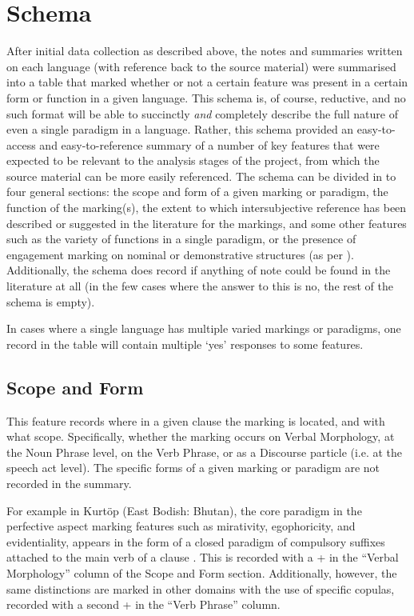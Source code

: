 \section{Schema}\label{s:Methods:Schema}
After initial data collection as described above, the notes and summaries written on each language (with reference back to the source material) were summarised into a table that marked whether or not a certain feature was present in a certain form or function in a given language. This schema is, of course, reductive, and no such format will be able to succinctly \textit{and} completely describe the full nature of even a single paradigm in a language. Rather, this schema provided an easy-to-access and easy-to-reference summary of a number of key features that were expected to be relevant to the analysis stages of the project, from which the source material can be more easily referenced. The schema can be divided in to four general sections: the scope and form of a given marking or paradigm, the function of the marking(s), the extent to which intersubjective reference has been described or suggested in the literature for the markings, and some other features such as the variety of functions in a single paradigm, or the presence of engagement marking on nominal or demonstrative structures (as per ). Additionally, the schema does record if anything of note could be found in the literature at all (in the few cases where the answer to this is no, the rest of the schema is empty).

In cases where a single language has multiple varied markings or paradigms, one record in the table will contain multiple `yes' responses to some features.

\subsection{Scope and Form}
This feature records where in a given clause the marking is located, and with what scope. Specifically, whether the marking occurs on Verbal Morphology, at the Noun Phrase level, on the Verb Phrase, or as a Discourse particle (i.e. at the speech act level). The specific forms of a given marking or paradigm are not recorded in the summary.

For example in Kurtöp (East Bodish: Bhutan), the core paradigm in the perfective aspect marking features such as mirativity, egophoricity, and evidentiality, appears in the form of a closed paradigm of compulsory suffixes attached to the main verb of a clause \cite{Hyslop2018}. This is recorded with a + in the ``Verbal Morphology'' column of the Scope and Form section. Additionally, however, the same distinctions are marked in other domains with the use of specific copulas, recorded with a second + in the ``Verb Phrase'' column.

